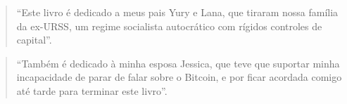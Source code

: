 \newpage \vspace*{8cm}
\thispagestyle{empty}
\begin{quotation}
\begin{center}
  \large
  \enquote{Este livro é dedicado a meus pais Yury e Lana, que tiraram nossa família da ex-URSS, um regime socialista autocrático com rígidos controles de capital}.
\end{center}
\end{quotation}
\begin{quotation}
\begin{center}
  \enquote{Também é dedicado à minha esposa Jessica, que teve que suportar minha incapacidade de parar de falar sobre o Bitcoin, e por ficar acordada comigo até tarde para terminar este livro}.
\end{center}
\end{quotation}